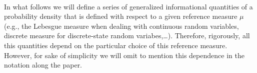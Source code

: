 \documentclass[english,sort&compress]{elsarticle}
\theoremstyle{definition}
\theoremstyle{plain}
\theoremstyle{plain}
\newcommand{\Esp}[1]{\mathbb{E}\left[ #1 \right]}
\begin{document}

\

In what follows we will define  a series of generalized informational quantities
of  a probability  density that  is defined  with respect  to a  given reference
measure $\mu$  (e.g., the Lebesgue  measure when dealing with  continuous random
variables,   discrete  measure   for  discrete-state   random  variabes,\ldots).
Therefore, rigorously,  all this quantities  depend on the particular  choice of
this reference measure. However, for sake  of simplicity we will omit to mention
this dependence in the notation along the paper.

\end{document}
